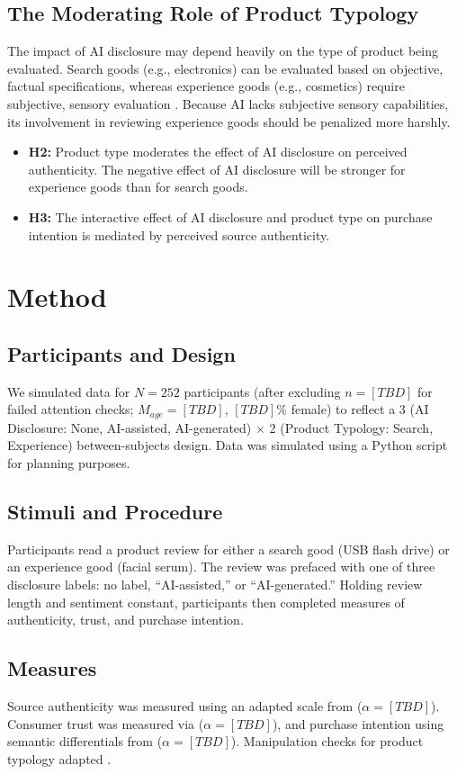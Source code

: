 \documentclass[12pt, letterpaper]{article}
\begin{document}
\subsection{The Moderating Role of Product Typology}
The impact of AI disclosure may depend heavily on the type of product being evaluated. Search goods (e.g., electronics) can be evaluated based on objective, factual specifications, whereas experience goods (e.g., cosmetics) require subjective, sensory evaluation \citep{nelson1970}. Because AI lacks subjective sensory capabilities, its involvement in reviewing experience goods should be penalized more harshly.
\begin{itemize}
    \item \textbf{H2:} Product type moderates the effect of AI disclosure on perceived authenticity. The negative effect of AI disclosure will be stronger for experience goods than for search goods.
    \item \textbf{H3:} The interactive effect of AI disclosure and product type on purchase intention is mediated by perceived source authenticity.
\end{itemize}

\section{Method}
\subsection{Participants and Design}
We simulated data for $N=252$ participants (after excluding $n=[TBD]$ for failed attention checks; $M_{age} = [TBD]$, $[TBD]\%$ female) to reflect a 3 (AI Disclosure: None, AI-assisted, AI-generated) $\times$ 2 (Product Typology: Search, Experience) between-subjects design. Data was simulated using a Python script for planning purposes.

\subsection{Stimuli and Procedure}
Participants read a product review for either a search good (USB flash drive) or an experience good (facial serum). The review was prefaced with one of three disclosure labels: no label, ``AI-assisted,'' or ``AI-generated.'' Holding review length and sentiment constant, participants then completed measures of authenticity, trust, and purchase intention.

\subsection{Measures}
Source authenticity was measured using an adapted scale from \citet{morhart2015} ($\alpha = [TBD]$). Consumer trust was measured via \citet{mcknight2002} ($\alpha = [TBD]$), and purchase intention using semantic differentials from \citet{putrevu1994} ($\alpha = [TBD]$). Manipulation checks for product typology adapted \citet{nelson1970}.
\end{document}
